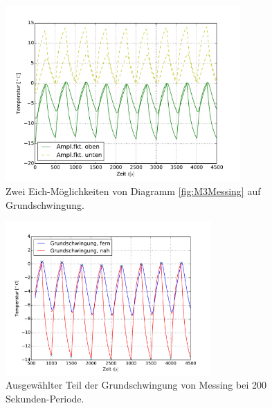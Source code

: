\begin{figure}[h!]
	\centering
	\includegraphics[width=0.8\textwidth]{Bilder/Normierungsauswahl/M3_Messing_norm.pdf}
	\caption{ Zwei Eich-Möglichkeiten von Diagramm \ref{fig:M3Messing} auf Grundschwingung.}
	\label{fig:M3MessingNorm}
\end{figure}
\begin{figure}[h!]
	\centering
	\includegraphics[width=0.7\textwidth]{Bilder/M3_Messing_norm.pdf}
	\caption{Ausgewählter Teil der Grundschwingung von Messing bei 200 Sekunden-Periode.}
	\label{fig:M3MessingNormkurve}
\end{figure}
